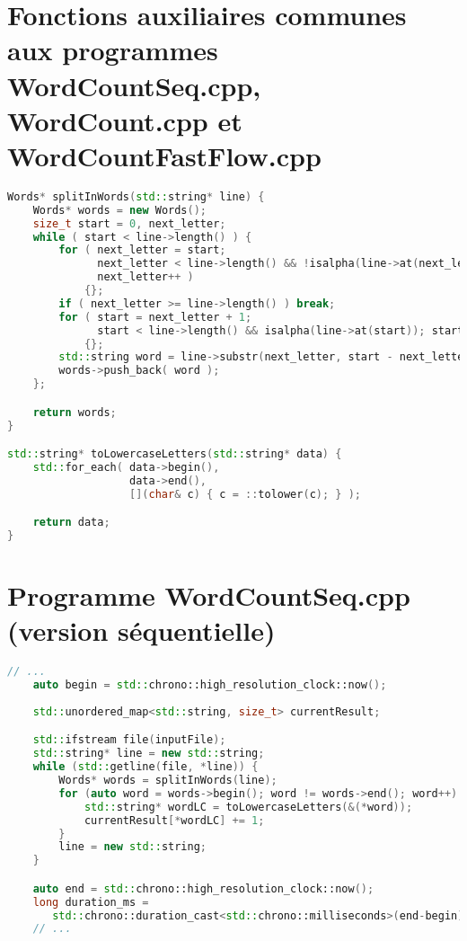 \newpage
\section{Fonctions auxiliaires communes aux programmes {WordCountSeq.cpp},
{WordCount.cpp} et {WordCountFastFlow.cpp}}

\begin{lstlisting}[basicstyle=\ttfamily\footnotesize,language=c++]
Words* splitInWords(std::string* line) {
    Words* words = new Words();
    size_t start = 0, next_letter;
    while ( start < line->length() ) {
        for ( next_letter = start;
              next_letter < line->length() && !isalpha(line->at(next_letter));
              next_letter++ )
            {};
        if ( next_letter >= line->length() ) break;
        for ( start = next_letter + 1;
              start < line->length() && isalpha(line->at(start)); start++ )
            {};
        std::string word = line->substr(next_letter, start - next_letter); 
        words->push_back( word );
    };

    return words;
}

std::string* toLowercaseLetters(std::string* data) {
    std::for_each( data->begin(),
                   data->end(),
                   [](char& c) { c = ::tolower(c); } );

    return data;
}
\end{lstlisting}


\newpage
\section{Programme {WordCountSeq.cpp} (version séquentielle)}
\begin{lstlisting}[gobble=4,basicstyle=\ttfamily\footnotesize,language=c++]
	// ...
	auto begin = std::chrono::high_resolution_clock::now();
	
    std::unordered_map<std::string, size_t> currentResult;

    std::ifstream file(inputFile);
    std::string* line = new std::string;
    while (std::getline(file, *line)) {
        Words* words = splitInWords(line);
        for (auto word = words->begin(); word != words->end(); word++) {
            std::string* wordLC = toLowercaseLetters(&(*word));
            currentResult[*wordLC] += 1;
        }
        line = new std::string;
    }

    auto end = std::chrono::high_resolution_clock::now();
    long duration_ms = 
       std::chrono::duration_cast<std::chrono::milliseconds>(end-begin).count();
	// ...
\end{lstlisting}

